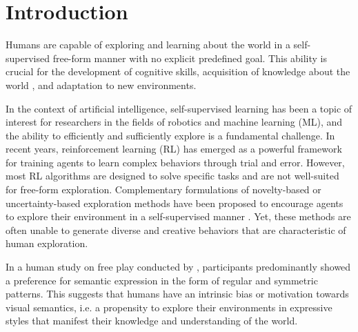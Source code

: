 \chapter{Introduction}
\label{sec:introduction}

Humans are capable of exploring and learning about the world in a self-supervised free-form manner with no explicit predefined goal. 
This ability is crucial for the development of cognitive skills, acquisition of knowledge about the world \citep{exploration,chu2020play}, and adaptation to new environments.


In the context of artificial intelligence, self-supervised learning has been a topic of interest for researchers in the fields of robotics and machine learning (ML), and the ability to efficiently and sufficiently explore is a fundamental challenge.
In recent years, reinforcement learning (RL) has emerged as a powerful framework for training agents to learn complex behaviors through trial and error.
However, most RL algorithms are designed to solve specific tasks and are not well-suited for free-form exploration.
Complementary formulations of novelty-based or uncertainty-based exploration methods have been proposed to encourage agents to explore their environment in a self-supervised manner \citep{rnd,icm,disagreement,exploration_survey}. 
Yet, these methods are often unable to generate diverse and creative behaviors that are characteristic of human exploration.



In a human study on free play conducted by \citet{diggs}, participants predominantly showed a preference for semantic expression in the form of regular and symmetric patterns.
This suggests that humans have an intrinsic bias or motivation towards visual semantics, i.e. a propensity to explore their environments in expressive styles that manifest their knowledge and understanding of the world.

